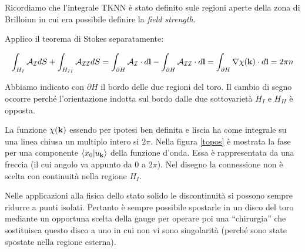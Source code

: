 \documentclass[12pt,a4paper]{article}
\begin{document}
Ricordiamo che l'integrale TKNN è stato definito sule regioni aperte della zona di Brilloiun in cui era possibile definire la \emph{field strength}.

Applico il teorema di Stokes separatamente:

\begin{equation}
\int_{H_{I}} \mathcal{A_{I}} dS + \int_{H_{II}} \mathcal{A_{II}} dS = \int_{\partial H} \mathcal{A_{I}} \cdot d \bold{l} - \int_{\partial H} \mathcal{A_{II}} \cdot d \bold{l} = \int_{\partial H} \nabla \chi (\bold{k}) \cdot d \bold{l} = 2 \pi n 
\end{equation}

Abbiamo indicato con $\partial H$ il bordo delle due regioni del toro. Il cambio di segno occorre perché l'orientazione indotta sul bordo dalle due sottovarietà $H_{I}$ e $H_{II}$ è opposta.

La funzione $\chi (\bold{k})$ essendo per ipotesi ben definita e liscia ha come integrale su una linea chiusa un multiplo intero si $2 \pi$. 
Nella figura \ref{topos} è mostrata la fase per una componente $\braket{x_0|u_{\bold{k}}}$ della funzione d'onda. Essa è rappresentata da una freccia (il cui angolo va appunto da $0$ a $2 \pi$). Nel disegno la connessione non è scelta con continuità nella regione $H_I$.

Nelle applicazioni alla fisica dello stato solido le discontinuità si possono sempre ridurre a punti isolati. Pertanto è sempre possibile spostarle in un disco del toro  mediante un opportuna scelta della gauge per operare poi una ``chirurgia'' che sostituisca questo disco a uno in cui non vi sono singolarità (perché sono state spostate nella regione esterna).
\end{document}

